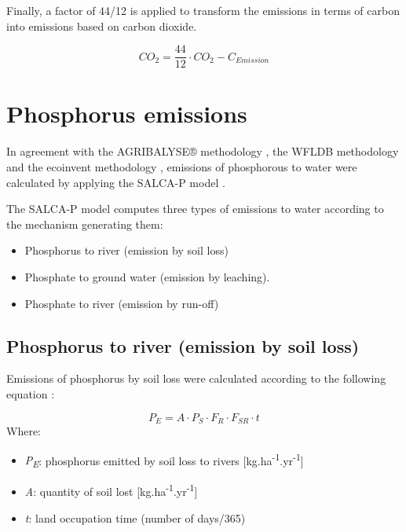 \documentclass[openany]{book}
\providecommand{\tightlist}{%
  \setlength{\itemsep}{0pt}\setlength{\parskip}{0pt}}
\begin{document}
Finally, a factor of 44/12 is applied to transform the emissions in terms of carbon into emissions based on carbon dioxide.

\[CO_2= \frac{44}{12} \cdot CO_2-C_{Emission}\]

\hypertarget{phosphorous-emissions}{%
\section{Phosphorus emissions}\label{phosphorous-emissions}}

In agreement with the AGRIBALYSE® methodology \citep{Koch2015}, the WFLDB methodology \citep{nemecek2014} and the ecoinvent methodology \citep{nemecek2011}, emissions of phosphorous to water were calculated by applying the SALCA-P model \citep{prasuhn2006}.

The SALCA-P model computes three types of emissions to water according to the mechanism generating them:

\begin{itemize}
\tightlist
\item
  Phosphorus to river (emission by soil loss)
\item
  Phosphate to ground water (emission by leaching).
\item
  Phosphate to river (emission by run-off)
\end{itemize}

\hypertarget{phosphorus-to-river-emission-by-soil-loss}{%
\subsection{Phosphorus to river (emission by soil loss)}\label{phosphorus-to-river-emission-by-soil-loss}}

Emissions of phosphorus by soil loss were calculated according to the following equation \citep{prasuhn2006}:

\[P_E=A \cdot P_S \cdot F_R \cdot F_{SR} \cdot t\]
Where:

\begin{itemize}
\item
  \emph{P\textsubscript{E}}: phosphorus emitted by soil loss to rivers {[}kg.ha\textsuperscript{-1}.yr\textsuperscript{-1}{]}
\item
  \emph{A}: quantity of soil lost {[}kg.ha\textsuperscript{-1}.yr\textsuperscript{-1}{]}
\item
  \emph{t}: land occupation time (number of days/365)
\end{itemize}
\end{document}
